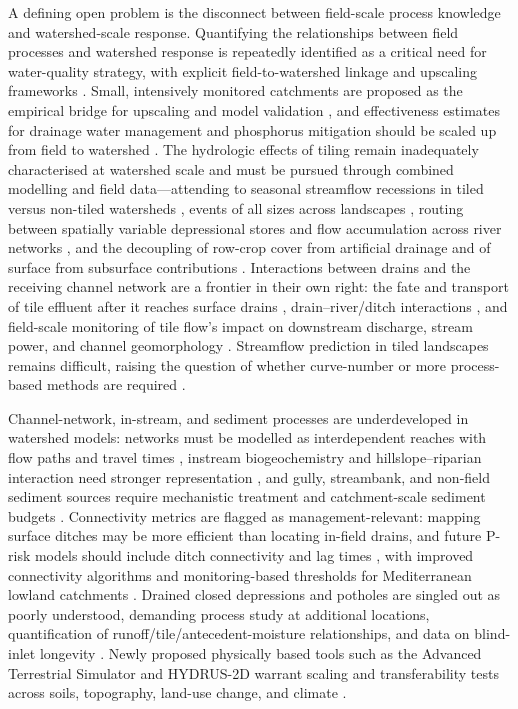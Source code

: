 \documentclass[11pt]{article}
\begin{document}
A defining open problem is the disconnect between field-scale process knowledge
and watershed-scale response. Quantifying the relationships between field
processes and watershed response is repeatedly identified as a critical need for
water-quality strategy, with explicit field-to-watershed linkage and upscaling
frameworks \parencite{Williams2015,Williams2017,Wang2020b}. Small, intensively
monitored catchments are proposed as the empirical bridge for upscaling and
model validation \parencite{Kyllmar2023,Basu2010}, and effectiveness estimates
for drainage water management and phosphorus mitigation should be scaled up from
field to watershed \parencite{Wang2021,Ross2016,Shedekar2021}. The hydrologic
effects of tiling remain inadequately characterised at watershed scale and must
be pursued through combined modelling and field data---attending to seasonal
streamflow recessions in tiled versus non-tiled watersheds
\parencite{Schilling2008,Schilling2012}, events of all sizes across landscapes
\parencite{Sloan2017}, routing between spatially variable depressional stores and
flow accumulation across river networks \parencite{Sloan2016,Fonley2021}, and the
decoupling of row-crop cover from artificial drainage and of surface from
subsurface contributions \parencite{BolandBrien2014}. Interactions between drains
and the receiving channel network are a frontier in their own right: the fate and
transport of tile effluent after it reaches surface drains
\parencite{Clement2017}, drain--river/ditch interactions \parencite{Grangeon2021},
and field-scale monitoring of tile flow's impact on downstream discharge, stream
power, and channel geomorphology \parencite{Zhou2025,Zhou2013}. Streamflow
prediction in tiled landscapes remains difficult, raising the question of whether
curve-number or more process-based methods are required
\parencite{Wessel2022,Thomas2016,Rahman2014}.

Channel-network, in-stream, and sediment processes are underdeveloped in
watershed models: networks must be modelled as interdependent reaches with flow
paths and travel times \parencite{Giraud1997,Williamson2025}, instream
biogeochemistry and hillslope--riparian interaction need stronger representation
\parencite{Schilling2012b,Basu2010}, and gully, streambank, and non-field
sediment sources require mechanistic treatment and catchment-scale sediment
budgets \parencite{Maalim2013,Dalzell2018,Walling2002}. Connectivity metrics are
flagged as management-relevant: mapping surface ditches may be more efficient than
locating in-field drains, and future P-risk models should include ditch
connectivity and lag times \parencite{Moloney2020,Opoku2024}, with improved
connectivity algorithms and monitoring-based thresholds for Mediterranean lowland
catchments \parencite{Calsamiglia2018}. Drained closed depressions and potholes
are singled out as poorly understood, demanding process study at additional
locations, quantification of runoff/tile/antecedent-moisture relationships, and
data on blind-inlet longevity \parencite{Martin2019,Williams2020,Feyereisen2015b}.
Newly proposed physically based tools such as the Advanced Terrestrial Simulator
and HYDRUS-2D warrant scaling and transferability tests across soils,
topography, land-use change, and climate
\parencite{Rathore2025,Naderi2025,Basu2010}.
\end{document}
